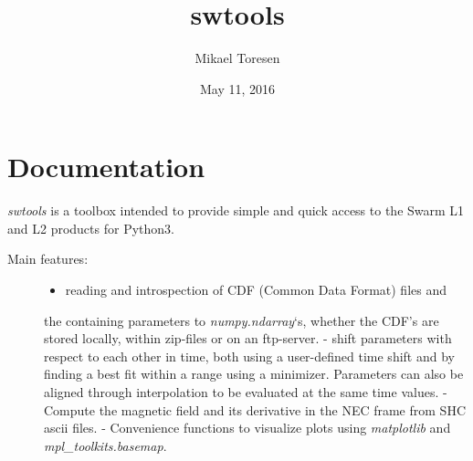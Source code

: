 \documentclass[letterpaper,10pt,english]{sphinxhowto}
\title{swtools}
\date{May 11, 2016}
\author{Mikael Toresen}
\begin{document}
\maketitle
\tableofcontents
{}\label{index::doc}

\label{index:index}\label{swtools_doc:swtools-doc}\label{swtools_doc:module-swtools}\label{swtools_doc:swtools-doc}

\section{Documentation}
\label{swtools_doc:swtools-index}\label{swtools_doc:documentation}\label{swtools_doc::doc}
\emph{swtools} is a toolbox intended to provide simple and quick access to
the Swarm L1 and L2 products for Python3.
\begin{description}
\item[{Main features:}] \leavevmode\begin{itemize}
\item {} 
reading and introspection of CDF (Common Data Format) files and

\end{itemize}

the containing parameters to \emph{numpy.ndarray}`s, whether the CDF's
are stored locally, within zip-files or on an ftp-server.
- shift parameters with respect to each other in time, both using a
user-defined time shift and by finding a best fit within a range
using a minimizer. Parameters can also be aligned through
interpolation to be evaluated at the same time values.
- Compute the magnetic field and its derivative in the NEC frame
from SHC ascii files.
- Convenience functions to visualize plots using \emph{matplotlib} and
\emph{mpl\_toolkits.basemap}.

\end{description}
\end{document}
